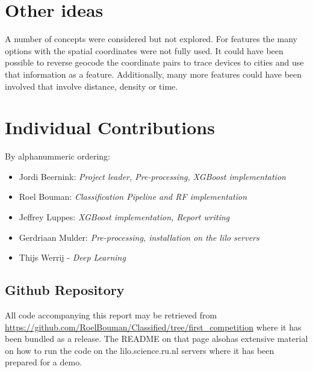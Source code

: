 \documentclass[runningheads,a4paper]{llncs}
\begin{document}
\section{Other ideas}
A number of concepts were considered but not explored. For features the many options with the spatial coordinates were not fully used. It could have been possible to reverse geocode the coordinate pairs to trace devices to cities and use that information as a feature. Additionally, many more features could have been involved that involve distance, density or time. 

\section{Individual Contributions}
By alphanummeric ordering:
\begin{itemize}
\item Jordi Beernink: \textit{Project leader, Pre-processing, XGBoost implementation}
\item Roel Bouman: \textit{Classification Pipeline and RF implementation}
\item Jeffrey Luppes: \textit{XGBoost implementation, Report writing}
\item Gerdriaan Mulder: \textit{Pre-processing, installation on the lilo servers}
\item Thijs Werrij - \textit{Deep Learning}
\end{itemize}
\subsection{Github Repository}
All code accompanying this report may be retrieved from \url{https://github.com/RoelBouman/Classified/tree/first_competition} where it has been bundled as a release. The README on that page alsohas extensive material on how to run the code on the lilo.science.ru.nl servers where it has been prepared for a demo. 
\end{document}
